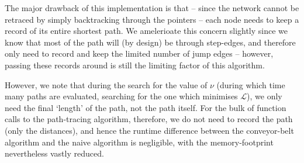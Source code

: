 \documentclass[fleqn,usenatbib]{mnras}
\begin{document}
				The major drawback of this implementation is that -- since the network cannot be retraced by simply backtracking through the pointers -- each node needs to keep a record of its entire shortest path. We amelerioate this concern slightly since we know that most of the path will (by design) be through step-edges, and therefore only need to record and keep the limited number of jump edges -- however, passing these records around is still the limiting factor of this algorithm. 

				However, we note that during the search for the value of $\nu$ (during which time many paths are evaluated, searching for the one which minimises $\mathcal{L}$), we only need the final `length' of the path, not the path itself. For the bulk of function calls to the path-tracing algorithm, therefore, we do not need to record the path (only the distances), and hence the runtime difference between the conveyor-belt algorithm and the naive algorithm is negligible, with the memory-footprint nevertheless vastly reduced.
\end{document}
